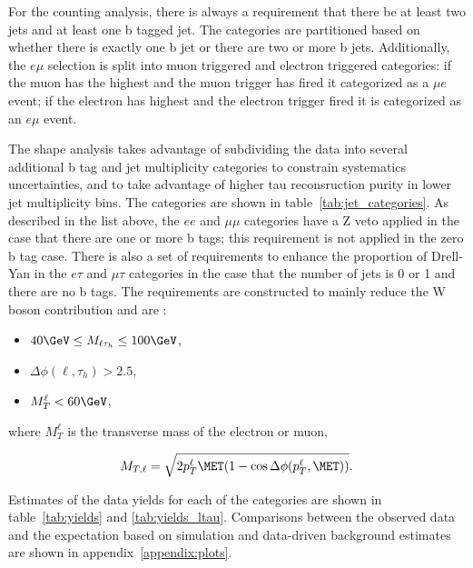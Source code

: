 For the counting analysis, there is always a requirement that there be
at least two jets and at least one b tagged jet. The categories are
partitioned based on whether there is exactly one b jet or there are two
or more b jets.  Additionally, the $e\mu$ selection is split into muon
triggered and electron triggered categories: if the muon has the highest
\pt and the muon trigger has fired it categorized as a $\mu e$ event; if
the electron has highest \pt and the electron trigger fired it is
categorized as an $e \mu$ event.

The shape analysis takes advantage of subdividing the data into several
additional b tag and jet multiplicity categories to constrain
systematics uncertainties, and to take advantage of higher tau
reconsruction purity in lower jet multiplicity bins.  The categories are
shown in table~\ref{tab:jet_categories}.  As described in the list
above, the $ee$ and $\mu\mu$ categories have a Z veto applied in the
case that there are one or more b tags; this requirement is not applied
in the zero b tag case.  There is also a set of requirements to enhance
the proportion of Drell-Yan in the $e\tau$ and $\mu\tau$ categories in
the case that the number of jets is 0 or 1 and there are no b tags.  The
requirements are constructed to mainly reduce the W boson contribution
and are :

\begin{itemize}
    \item $40 \GeV \leq M_{\ell\tau_{h}} \leq 100 \GeV$,
    \item $\Delta\phi(\ell, \tau_{h}) > 2.5$,
    \item $M_{T}^{\ell} < 60 \GeV$,
\end{itemize}

where $M_{T}^{\ell}$ is the transverse mass of the electron or muon,

\begin{equation}
\label{eq:trans_mass}
    M_{T,\ell} = \sqrt{2 p_{T}^{\ell}\MET (1-\cos\Delta\phi(p_{T}^{\ell}, \MET))}.
\end{equation}



Estimates of the data yields for each of the categories are shown in
table~\ref{tab:yields} and \ref{tab:yields_ltau}.  Comparisons between
the observed data and the expectation based on simulation and
data-driven background estimates are shown in
appendix~\ref{appendix:plots}. 





\FloatBarrier
